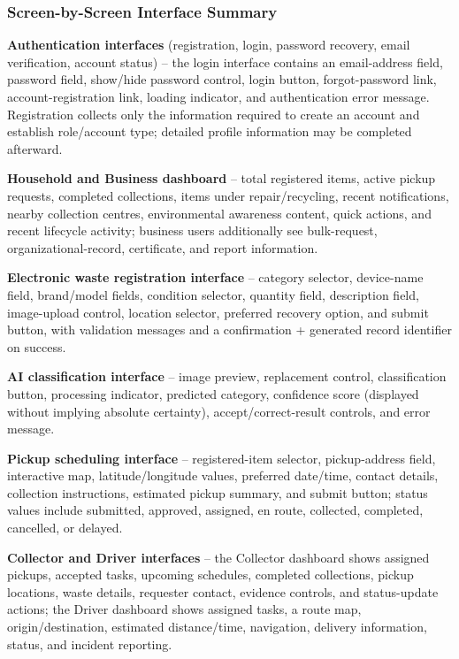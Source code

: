 \subsubsection{Screen-by-Screen Interface Summary}

\textbf{Authentication interfaces} (registration, login, password recovery,
email verification, account status) -- the login interface contains an
email-address field, password field, show/hide password control, login
button, forgot-password link, account-registration link, loading indicator, and
authentication error message. Registration collects only the information
required to create an account and establish role/account type; detailed profile
information may be completed afterward.

\textbf{Household and Business dashboard} -- total registered items, active
pickup requests, completed collections, items under repair/recycling, recent
notifications, nearby collection centres, environmental awareness content,
quick actions, and recent lifecycle activity; business users additionally see
bulk-request, organizational-record, certificate, and report information.

\textbf{Electronic waste registration interface} -- category selector,
device-name field, brand/model fields, condition selector, quantity field,
description field, image-upload control, location selector, preferred recovery
option, and submit button, with validation messages and a confirmation +
generated record identifier on success.

\textbf{AI classification interface} -- image preview, replacement control,
classification button, processing indicator, predicted category, confidence
score (displayed without implying absolute certainty), accept/correct-result
controls, and error message.

\textbf{Pickup scheduling interface} -- registered-item selector,
pickup-address field, interactive map, latitude/longitude values, preferred
date/time, contact details, collection instructions, estimated pickup summary,
and submit button; status values include submitted, approved, assigned, en
route, collected, completed, cancelled, or delayed.

\textbf{Collector and Driver interfaces} -- the Collector dashboard shows
assigned pickups, accepted tasks, upcoming schedules, completed collections,
pickup locations, waste details, requester contact, evidence controls, and
status-update actions; the Driver dashboard shows assigned tasks, a route map,
origin/destination, estimated distance/time, navigation, delivery information,
status, and incident reporting.

